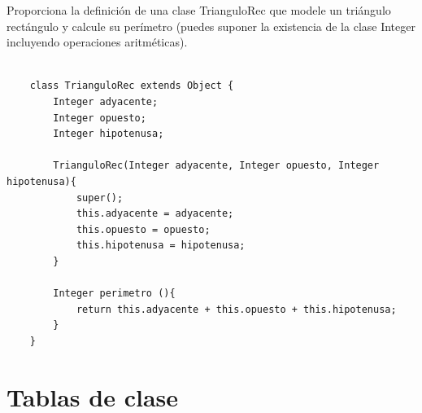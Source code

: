 \begin{exercise}
    Proporciona la definición de una clase \textsf{TrianguloRec} que modele un triángulo rectángulo y calcule su perímetro (puedes suponer la existencia de la clase \textsf{Integer} incluyendo operaciones aritméticas). 
    \begin{verbatim}
    
    class TrianguloRec extends Object {
        Integer adyacente;
        Integer opuesto;
        Integer hipotenusa;
    
        TrianguloRec(Integer adyacente, Integer opuesto, Integer hipotenusa){
            super();
            this.adyacente = adyacente;
            this.opuesto = opuesto;
            this.hipotenusa = hipotenusa;
        }
    
        Integer perimetro (){
            return this.adyacente + this.opuesto + this.hipotenusa;
        }
    }
    \end{verbatim}
\end{exercise}

\bigskip


\section{Tablas de clase}


